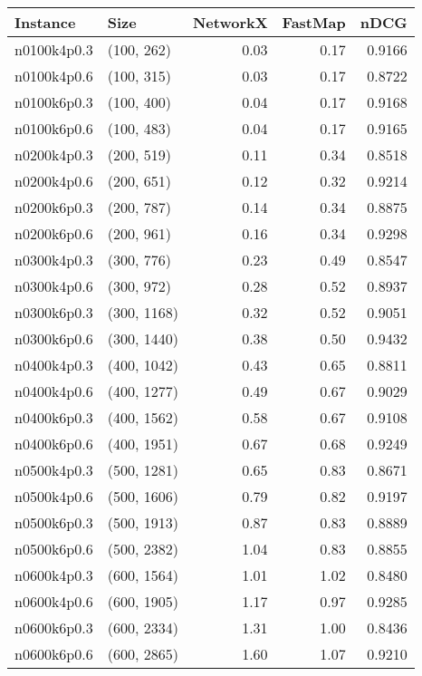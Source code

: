 \begin{tabular}{llrrr}
\toprule
   Instance &          Size &  NetworkX &  FastMap &   nDCG \\
\midrule
n0100k4p0.3 &    (100, 262) &      0.03 &     0.17 & 0.9166 \\
n0100k4p0.6 &    (100, 315) &      0.03 &     0.17 & 0.8722 \\
n0100k6p0.3 &    (100, 400) &      0.04 &     0.17 & 0.9168 \\
n0100k6p0.6 &    (100, 483) &      0.04 &     0.17 & 0.9165 \\
n0200k4p0.3 &    (200, 519) &      0.11 &     0.34 & 0.8518 \\
n0200k4p0.6 &    (200, 651) &      0.12 &     0.32 & 0.9214 \\
n0200k6p0.3 &    (200, 787) &      0.14 &     0.34 & 0.8875 \\
n0200k6p0.6 &    (200, 961) &      0.16 &     0.34 & 0.9298 \\
n0300k4p0.3 &    (300, 776) &      0.23 &     0.49 & 0.8547 \\
n0300k4p0.6 &    (300, 972) &      0.28 &     0.52 & 0.8937 \\
n0300k6p0.3 &   (300, 1168) &      0.32 &     0.52 & 0.9051 \\
n0300k6p0.6 &   (300, 1440) &      0.38 &     0.50 & 0.9432 \\
n0400k4p0.3 &   (400, 1042) &      0.43 &     0.65 & 0.8811 \\
n0400k4p0.6 &   (400, 1277) &      0.49 &     0.67 & 0.9029 \\
n0400k6p0.3 &   (400, 1562) &      0.58 &     0.67 & 0.9108 \\
n0400k6p0.6 &   (400, 1951) &      0.67 &     0.68 & 0.9249 \\
n0500k4p0.3 &   (500, 1281) &      0.65 &     0.83 & 0.8671 \\
n0500k4p0.6 &   (500, 1606) &      0.79 &     0.82 & 0.9197 \\
n0500k6p0.3 &   (500, 1913) &      0.87 &     0.83 & 0.8889 \\
n0500k6p0.6 &   (500, 2382) &      1.04 &     0.83 & 0.8855 \\
n0600k4p0.3 &   (600, 1564) &      1.01 &     1.02 & 0.8480 \\
n0600k4p0.6 &   (600, 1905) &      1.17 &     0.97 & 0.9285 \\
n0600k6p0.3 &   (600, 2334) &      1.31 &     1.00 & 0.8436 \\
n0600k6p0.6 &   (600, 2865) &      1.60 &     1.07 & 0.9210 \\

\end{tabular}

